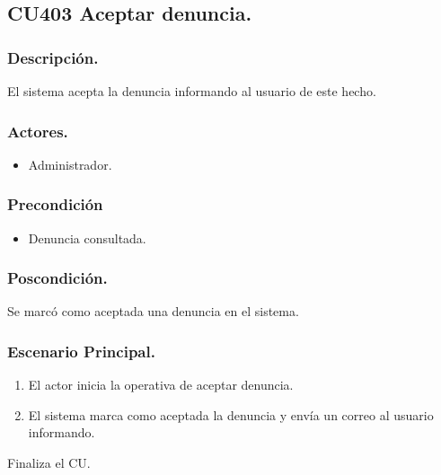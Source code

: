 \subsection{CU403 Aceptar denuncia.}
\subsubsection{Descripci\'{o}n.}
El sistema acepta la denuncia informando al usuario de este hecho.
\subsubsection{Actores.}
\begin{itemize}
\item Administrador.
\end{itemize}
\subsubsection{Precondici\'{o}n}
\begin{itemize}
\item Denuncia consultada.
\end{itemize}
\subsubsection{Poscondici\'{o}n.}
Se marc\'{o} como aceptada una denuncia en el sistema.
\subsubsection{Escenario Principal.}
\begin{enumerate}
\item El actor inicia la operativa de aceptar denuncia.
\item El sistema marca como aceptada la denuncia y envía un correo al usuario informando.
\end{enumerate}
Finaliza el CU.
